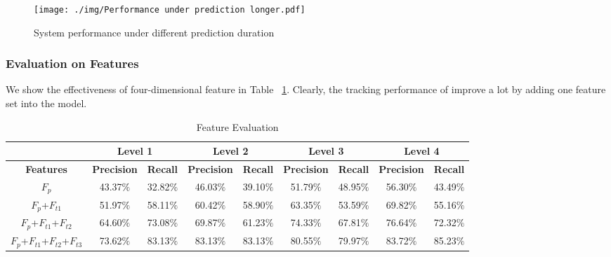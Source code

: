 \begin{figure}[!t]
\centering
\texttt{[image: ./img/Performance under prediction
longer.pdf]}
\caption{System performance under different prediction duration}
\label{fig:per_under_various_pred_days}
\end{figure}



\subsubsection{Evaluation on Features}

We show the effectiveness of four-dimensional feature in Table ~\ref{Feature_Evaluation}. Clearly, the tracking performance of \sysname improve a lot by adding one feature set into the model.



\begin{table}[]
\small
\centering
\caption{Feature Evaluation}
\label{Feature_Evaluation}
\begin{tabular}{|c|c|c|c|c|c|c|c|c|}
\hline
                                   & \multicolumn{2}{c|}{\textbf{Level 1}}                     & \multicolumn{2}{c|}{\textbf{Level 2}} & \multicolumn{2}{c|}{\textbf{Level 3}}                     & \multicolumn{2}{c|}{\textbf{Level 4}}                     \\ \hline
\textbf{Features}                  & \textbf{Precision} & \multicolumn{1}{l|}{\textbf{Recall}} & \textbf{Precision}  & \textbf{Recall} & \textbf{Precision} & \multicolumn{1}{l|}{\textbf{Recall}} & \textbf{Precision} & \multicolumn{1}{l|}{\textbf{Recall}} \\ \hline
$F_{p}$                            & 43.37$\%$               & 32.82$\%$                                 & 46.03$\%$                & 39.10$\%$            & 51.79$\%$               & 48.95$\%$                                 & 56.30$\%$               & 43.49$\%$                                 \\ \hline
$F_{p}$+$F_{t1}$                   & 51.97$\%$               & 58.11$\%$                                 & 60.42$\%$                & 58.90$\%$            & 63.35$\%$               & 53.59$\%$                                 & 69.82$\%$               & 55.16$\%$                                 \\ \hline
$F_{p}$+$F_{t1}$+$F_{t2}$          & 64.60$\%$               & 73.08$\%$                                 & 69.87$\%$                & 61.23$\%$            & 74.33$\%$               & 67.81$\%$                                 & 76.64$\%$               & 72.32$\%$                                 \\ \hline
$F_{p}$+$F_{t1}$+$F_{t2}$+$F_{t3}$ & 73.62$\%$   & 83.13$\%$                                 & 83.13$\%$               & 83.13$\%$            & 80.55$\%$   & 79.97$\%$
& 83.72$\%$               & 85.23$\%$                                  \\ \hline
\end{tabular}
\end{table}


